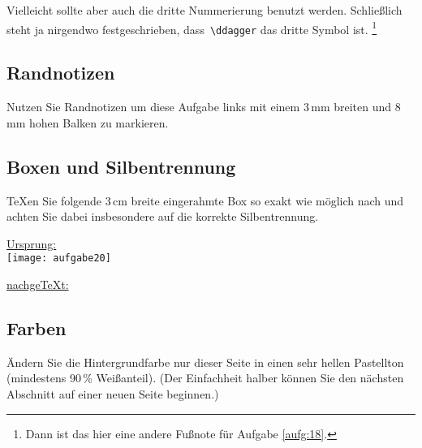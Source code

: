 Vielleicht sollte aber auch die dritte Nummerierung benutzt werden. 
Schließlich steht ja nirgendwo festgeschrieben, 
dass~\verb*|\ddagger| das dritte Symbol ist. 
\hspace{-0.1cm}\footnote[3]{Dann ist das hier eine andere Fußnote für Aufgabe \ref{aufg:18}.}

\subsection{Randnotizen}
\begin{aufgabe}
Nutzen Sie Randnotizen um diese Aufgabe links mit einem 3\,mm breiten und 8\,mm hohen Balken zu markieren.

\reversemarginpar
\marginpar{\rule[0pt]{3mm}{8mm}}
\end{aufgabe}

\subsection{Boxen und Silbentrennung}
\begin{aufgabe}
\TeX en Sie folgende 3\,cm breite eingerahmte Box so exakt wie m\"oglich nach und achten Sie dabei insbesondere auf die korrekte Silbentrennung.
\end{aufgabe}

\noindent \underline{Ursprung:} \\
\noindent\texttt{[image: aufgabe20]}

\noindent \underline{nachge\TeX t:}\\
\indent \hspace{-0.7cm}

\subsection{Farben}						%
\begin{aufgabe}
\"Andern Sie die Hintergrundfarbe nur dieser Seite in einen sehr hellen Pastellton (mindestens 90\,\% Wei\ss{}anteil). (Der Einfachheit halber k\"onnen Sie den n\"achsten Abschnitt auf einer neuen Seite beginnen.)
\end{aufgabe}
\pagecolor{LightGrey}